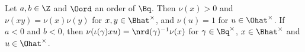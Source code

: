 Let $a,b\in\Z$ and $\Oord$ an order of $\Bq$. Then $\nu(x)>0$ and $\nu(xy)=\nu(x)\nu(y)$ for $x,y\in\Bhat^\times$, and $\nu(u)=1$ for
$u\in\Ohat^\times$. If $a<0$ and $b<0$, then $\nu(\iota(\gamma)xu)=\nrd(\gamma)^{-1}\nu(x)$ for $\gamma\in\Bq^\times$, $x\in\Bhat^\times$ and
$u\in\Ohat^\times$.
